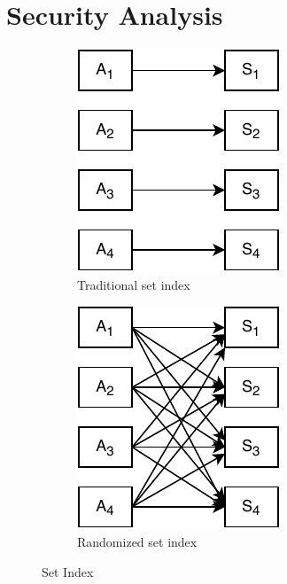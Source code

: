
\section{Security Analysis}
\begin{figure}
\centering
\begin{subfigure}{.4\columnwidth}
  \centering
  \includegraphics[width=0.8\linewidth]{figures/Set_diagram.pdf}
  \caption{Traditional set index}
  \label{fig:one-to-one}
\end{subfigure}%
\begin{subfigure}{.4\columnwidth}
  \centering
  \includegraphics[width=0.8\linewidth]{figures/many-to-many.pdf}
  \caption{Randomized set index}
  \label{fig:many-to-many}
\end{subfigure}
\caption{Set Index}
\label{fig:set_diagram}
\end{figure}
